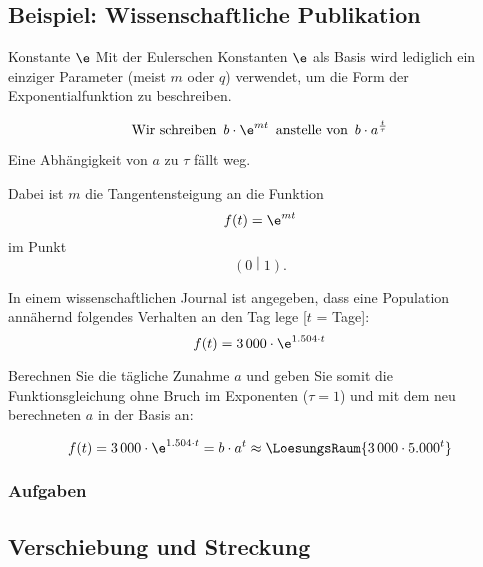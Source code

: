 \newpage

\subsection{Beispiel: Wissenschaftliche Publikation}


\begin{bemerkung}{Konstante $\e$}{}
  Mit der Eulerschen Konstanten $\e$ als Basis wird lediglich ein einziger
  Parameter (meist $m$ oder $q$) verwendet, um die Form der
  Exponentialfunktion zu beschreiben.

  $$\text{Wir schreiben }\, b\cdot{}\e^{mt} \,\text{ anstelle von }\, b\cdot{}a^{\frac{t}{\tau}}$$

  Eine Abhängigkeit von $a$ zu $\tau$ fällt weg.

  Dabei ist $m$ die Tangentensteigung an die Funktion $$f(t) = \e^{mt}$$
  im Punkt $$\left(0\middle|1\right).$$
\end{bemerkung}



In einem wissenschaftlichen Journal ist angegeben, dass eine Population annähernd folgendes Verhalten an den Tag lege [$t$ = Tage]:
$$f(t) = 3\,000\cdot{}\e^{1.504\cdot{}t}$$

Berechnen Sie die tägliche Zunahme $a$ und geben Sie somit die Funktionsgleichung ohne Bruch im Exponenten ($\tau = 1$) und mit dem neu berechneten $a$ in der Basis an:

$$f(t) = 3\,000\cdot{}\e^{1.504\cdot{}t} = b\cdot{}a^t \approx \LoesungsRaum{3\,000\cdot{}5.000^t}$$



\subsubsection*{Aufgaben}
\newpage


\subsection{Verschiebung und Streckung }

